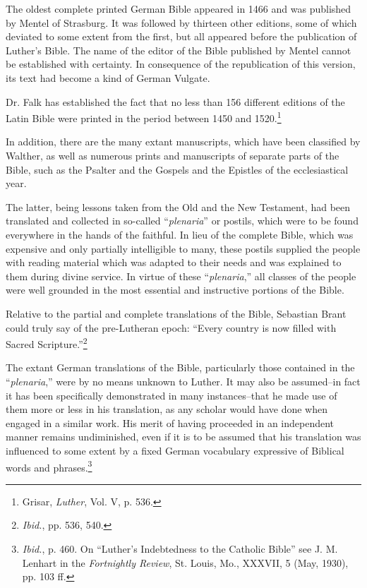 The oldest complete printed German Bible appeared in 1466 and was published
by Mentel of Strasburg. It was followed by thirteen other editions,
some of which deviated to some extent from the first, but all appeared
before the publication of Luther’s Bible. The name of the editor of the Bible
published by Mentel cannot be established with certainty. In consequence
of the republication of this version, its text had become a kind of German
Vulgate.

Dr. Falk has established the fact that no less than 156 different editions
of the Latin Bible were printed in the period between 1450 and 1520.\footnote{Grisar, \textit{Luther}, Vol. V, p. 536.}

In addition, there are the many extant manuscripts, which have been classified
by Walther, as well as numerous prints and manuscripts of separate
parts of the Bible, such as the Psalter and the Gospels and the Epistles of the
ecclesiastical year.

The latter, being lessons taken from the Old and the New Testament,
had been translated and collected in so-called ``\textit{plenaria}'' or postils, which
were to be found everywhere in the hands of the faithful. In lieu of the
complete Bible, which was expensive and only partially intelligible to many,
these postils supplied the people with reading material which was adapted
to their needs and was explained to them during divine service. In virtue of
these “\textit{plenaria},” all classes of the people were well grounded in the most
essential and instructive portions of the Bible.

Relative to the partial and complete translations of the Bible, Sebastian
Brant could truly say of the pre-Lutheran epoch: “Every
country is now filled with Sacred Scripture.”\footnote{\textit{Ibid.}, pp. 536, 540.}

The extant German translations of the Bible, particularly those contained
in the “\textit{plenaria},” were by no means unknown to Luther. It
may also be assumed--in fact it has been specifically demonstrated in
many instances--that he made use of them more or less in his translation,
as any scholar would have done when engaged in a similar
work. His merit of having proceeded in an independent manner remains undiminished,
even if it is to be assumed that his translation
was influenced to some extent by a fixed German vocabulary expressive
of Biblical words and phrases.\footnote
{\textit{Ibid.}, p. 460. On “Luther’s Indebtedness to the Catholic Bible” see J. M. Lenhart in
the \textit{Fortnightly Review}, St. Louis, Mo., XXXVII, 5 (May, 1930), pp. 103 ff.}

